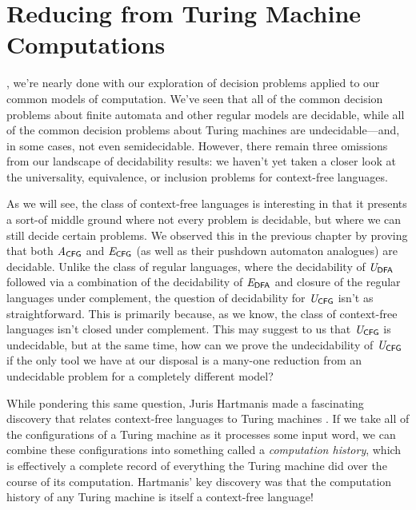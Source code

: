 \section{Reducing from Turing Machine Computations}\label{sec:reductionsTMcomputations}

, we're nearly done with our exploration of decision problems applied to our common models of computation. We've seen that all of the common decision problems about finite automata and other regular models are decidable, while all of the common decision problems about Turing machines are undecidable---and, in some cases, not even semidecidable. However, there remain three omissions from our landscape of decidability results: we haven't yet taken a closer look at the universality, equivalence, or inclusion problems for context-free languages.

As we will see, the class of context-free languages is interesting in that it presents a sort-of middle ground where not every problem is decidable, but where we can still decide certain problems. We observed this in the previous chapter by proving that both $\mathit{A}_{\textsf{CFG}}$ and $\mathit{E}_{\textsf{CFG}}$ (as well as their pushdown automaton analogues) are decidable. Unlike the class of regular languages, where the decidability of $\mathit{U}_{\textsf{DFA}}$ followed via a combination of the decidability of $\mathit{E}_{\textsf{DFA}}$ and closure of the regular languages under complement, the question of decidability for $\mathit{U}_{\textsf{CFG}}$ isn't as straightforward. This is primarily because, as we know, the class of context-free languages isn't closed under complement. This may suggest to us that $\mathit{U}_{\textsf{CFG}}$ is undecidable, but at the same time, how can we prove the undecidability of $\mathit{U}_{\textsf{CFG}}$ if the only tool we have at our disposal is a many-one reduction from an undecidable problem for a completely different model?

While pondering this same question, Juris Hartmanis made a fascinating discovery that relates context-free languages to Turing machines \citeyearpar{Hartmanis1967CFLsAndTMComputations}. If we take all of the configurations of a Turing machine as it processes some input word, we can combine these configurations into something called a \emph{computation history}, which is effectively a complete record of everything the Turing machine did over the course of its computation. Hartmanis' key discovery was that the computation history of any Turing machine is itself a context-free language!

